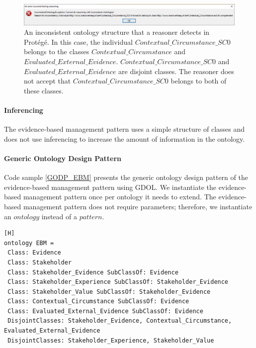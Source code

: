 \begin{figure}[H]
\centering
  \includegraphics[width=17cm]{../../Images/04_Contribution/Consistency.png}
  \caption{An inconsistent ontology structure that a reasoner detects in Prot\'eg\'e. In this case, the individual $Contextual\_Circumstance\_SC0$ belongs to the classes $Contextual\_Circumstance$ and $Evaluated\_External\_Evidence$. $Contextual\_Circumstance\_SC0$ and $Evaluated\_External\_Evidence$ are disjoint classes. The reasoner does not accept that $Contextual\_Circumstance\_SC0$ belongs to both of these classes.}
  \label{fig:consistency_ebm}
\end{figure}

\paragraph{Inferencing}
The evidence-based management pattern uses a simple structure of classes and does not use inferencing to increase the amount of information in the ontology. 

\paragraph{Generic Ontology Design Pattern}
Code sample \ref{GODP_EBM} presents the generic ontology design pattern of the evidence-based management pattern using GDOL. We instantiate the evidence-based management pattern once per ontology it needs to extend. The evidence-based management pattern does not require parameters; therefore, we instantiate an $ontology$ instead of a $pattern$.

\begin{lstlisting}[float,language=GDOL,caption={The GDOL code that instantiates the generic ontology design pattern for evidence-based management. The instantiation includes the instantiation of the classes as well as the characteristics of those classes. Figure \ref{fig:classification} presents the structure of the pattern. },label={GODP_EBM}][H]
ontology EBM =
 Class: Evidence
 Class: Stakeholder
 Class: Stakeholder_Evidence SubClassOf: Evidence 
 Class: Stakeholder_Experience SubClassOf: Stakeholder_Evidence 
 Class: Stakeholder_Value SubClassOf: Stakeholder_Evidence 
 Class: Contextual_Circumstance SubClassOf: Evidence 
 Class: Evaluated_External_Evidence SubClassOf: Evidence 
 DisjointClasses: Stakeholder_Evidence, Contextual_Circumstance, Evaluated_External_Evidence	
 DisjointClasses: Stakeholder_Experience, Stakeholder_Value
\end{lstlisting}

